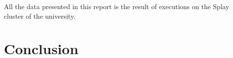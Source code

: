 \documentclass[11pt,a4paper,parskip=half]{scrartcl}
\begin{document}
All the data presented in this report is the result of executions on the Splay cluster of the university.

\section{Conclusion}

\begin{otherlanguage}{australian}
\printbibliography
\end{otherlanguage}
\end{document}
